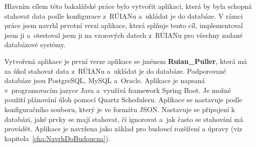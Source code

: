 Hlavním cílem této bakalářské práce bylo vytvořit aplikaci, která by byla
schopná stahovat data podle konfigurace z~RÚIANu a~ukládat je do databáze.
V rámci práce jsem navrhl prvotní verzi aplikace, která splňuje tento cíl,
implementoval jsem ji a~otestoval jsem ji na vzorových datech z~RÚIANu
pro všechny zadané databázové systémy.

Vytvořená aplikace je první verze aplikace se jménem \textbf{Ruian\_Puller},
která má za úkol stahovat data z~RÚIANu a~ukládat je do databáze.
Podporované databáze jsou PostgreSQL, MySQL a~Oracle.
Aplikace je napsaná v~programovacím jazyce Java a~využívá framework Spring Boot.
Je možné použití plánování úloh pomocí Quartz Scheduleru.
Aplikace se nastavuje podle konfiguračního souboru,
který je ve formátu JSON. Nastavuje se připojení k databázi,
jaké prvky se mají stahovat, či ignorovat a~jak často se stahování má provádět.
Aplikace je navržena jako základ pro budoucí rozšíření a úpravy (viz kapitola~\ref{cha:NavrhDoBudoucna}).